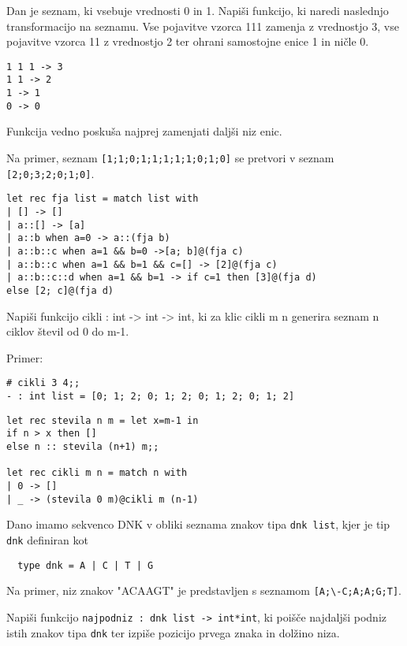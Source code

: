 \begin{ex}
Dan je seznam, ki vsebuje vrednosti 0 in 1. Napi\v si funkcijo, ki naredi naslednjo transformacijo na seznamu. Vse pojavitve vzorca 111 zamenja z vrednostjo 3, vse pojavitve vzorca 11 z vrednostjo 2 ter ohrani samostojne enice 1 in ni\v cle 0. 
\begin{lstlisting}
1 1 1 -> 3
1 1 -> 2
1 -> 1
0 -> 0
\end{lstlisting}

Funkcija vedno posku\v sa najprej zamenjati dalj\v si niz enic.

Na primer, seznam \lstinline{[1;1;0;1;1;1;1;1;0;1;0]} se pretvori v seznam \lstinline{[2;0;3;2;0;1;0]}.

\begin{sol}
\begin{lstlisting}
let rec fja list = match list with
| [] -> []
| a::[] -> [a]
| a::b when a=0 -> a::(fja b)
| a::b::c when a=1 && b=0 ->[a; b]@(fja c)
| a::b::c when a=1 && b=1 && c=[] -> [2]@(fja c)
| a::b::c::d when a=1 && b=1 -> if c=1 then [3]@(fja d)
else [2; c]@(fja d)
\end{lstlisting}
\end{sol}
\end{ex}



\begin{ex}
  Napi\v si funkcijo cikli : int -> int -> int, ki za klic cikli m n
  generira seznam n ciklov \v stevil od 0 do m-1.

\noindent\/Primer:
\begin{lstlisting}
# cikli 3 4;; 
- : int list = [0; 1; 2; 0; 1; 2; 0; 1; 2; 0; 1; 2]
\end{lstlisting}

\begin{sol}
\begin{lstlisting}
let rec stevila n m = let x=m-1 in
if n > x then []
else n :: stevila (n+1) m;;

let rec cikli m n = match n with
| 0 -> []
| _ -> (stevila 0 m)@cikli m (n-1)
\end{lstlisting}
\end{sol}

\end{ex} 



\begin{ex}
  \label{dnk-naloga}
  Dano imamo sekvenco DNK v obliki seznama znakov tipa \lstinline{dnk list},
  kjer je tip \lstinline{dnk} definiran kot

  \begin{lstlisting}
  type dnk = A | C | T | G
  \end{lstlisting}
  Na primer, niz znakov "ACAAGT"  je predstavljen s seznamom 
  \lstinline{[A;\-C;A;A;G;T]}. 

  Napi\v si funkcijo \lstinline{najpodniz : dnk list -> int*int}, ki
  poi\v s\v ce najdalj\v si podniz istih znakov tipa \lstinline{dnk} ter
  izpi\v se pozicijo prvega znaka in dol\v zino niza.
\end{ex} 



